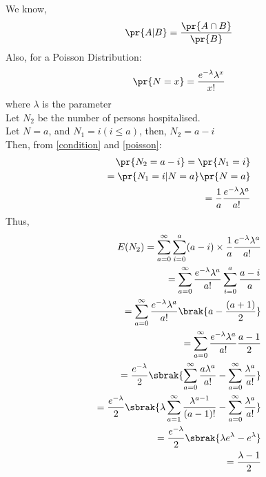 We know,
\begin{align}
    \pr{A|B} = \frac{\pr{A\cap B}}{\pr{B}}
\end{align}
Also, for a Poisson Distribution:
\begin{align}
    \pr{N = x} = \frac{e^{-\lambda}\lambda^x}{x!}
    \label{poisson}
\end{align}
where $\lambda$ is the parameter\\
Let $N_2$ be the number of persons hospitalised.\\
Let $N = a$, and $N_1 = i(i\leq a)$, then, $N_2 = a-i$\\
Then, from \eqref{condition} and \eqref{poisson}:
\begin{align}
    \pr{N_2 = a-i} =\pr{N_1 = i}\\
    =\pr{N_1 = i|N = a}\pr{N = a}\\
     = \frac{1}{a}\frac{e^{-\lambda}\lambda^a}{a!}
\end{align}
Thus,
\begin{align}
    E(N_2) = \sum_{a = 0}^{\infty} \sum_{i = 0 }^{a} (a-i) \times \frac{1}{a}\frac{e^{-\lambda}\lambda^a}{a!}\\
     = \sum_{a=0}^{\infty}\frac{e^{-\lambda}\lambda^a}{a!} \sum_{i = 0 }^{a} \frac{a-i}{a}\\
    = \sum_{a=0}^{\infty}\frac{e^{-\lambda}\lambda^a}{a!} \brak{a - \frac{(a+1)}{2}}\\
     = \sum_{a=0}^{\infty}\frac{e^{-\lambda}\lambda^a}{a!}\frac{a-1}{2}\\
      = \frac{e^{-\lambda}}{2}\sbrak{\sum_{a=0}^{\infty}\frac{a\lambda^a}{a!} - \sum_{a=0}^{\infty}\frac{\lambda^a}{a!}}\\
       = \frac{e^{-\lambda}}{2}\sbrak{\lambda\sum_{a=1}^{\infty} \frac{\lambda^{a-1}}{(a-1)!} - \sum_{a=0}^{\infty}\frac{\lambda^a}{a!}}\\
        = \frac{e^{-\lambda}}{2}\sbrak{\lambda e^\lambda - e^\lambda}\\
         = \frac{\lambda - 1}{2}
\end{align}